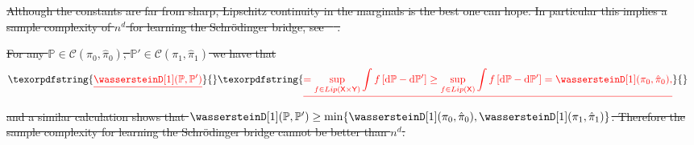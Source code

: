 \documentclass[11pt,a4paper]{article}
\providecommand{\DIFdeltex}[1]{{\protect\color{red}\sout{#1}}}                      %
\providecommand{\DIFdelbegin}{} %
\providecommand{\DIFdelend}{} %
\providecommand{\DIFdel}[1]{\texorpdfstring{\DIFdeltex{#1}}{}} %
\begin{document}
\DIFdelbegin %
\DIFdel{Although the constants are far from sharp, Lipschitz continuity in the marginals is the best one can hope. In particular this implies a sample complexity of $n^{d}$ for learning the Schr\"odinger bridge, see \mbox{%
\cite{fournier2015rate}}\hspace{0pt}%
. 
}%

\DIFdel{For any $\mathbb{P}\in \mathcal{C}(\pi_0, \hat{\pi}_0)$, $\mathbb{P}'\in \mathcal{C}(\pi_1, \hat{\pi}_1)$ we have that 
}\begin{eqnarray*}
\DIFdel{\wassersteinD[1](\mathbb{P}, \mathbb{P}')
}&\DIFdel{= \sup_{f \in Lip(\msx\times \msy)} \int f \left[ \rmd \mathbb{P}-\rmd \mathbb{P}' \right]\geq \sup_{f \in Lip(\msx)} \int f \left[ \rmd \mathbb{P}-\rmd \mathbb{P}' \right] = \wassersteinD[1](\pi_0, \hat{\pi}_0),
}\end{eqnarray*}%
\DIFdel{and a similar calculation shows that $\wassersteinD[1](\mathbb{P}, \mathbb{P}')\geq \min\{\wassersteinD[1](\pi_0, \hat{\pi}_0), \wassersteinD[1](\pi_1, \hat{\pi}_1)\}$.
 Therefore the sample complexity for learning the Schr\"odinger bridge cannot be better than $n^{d}$. 
}%

\DIFdelend %
\end{document}
